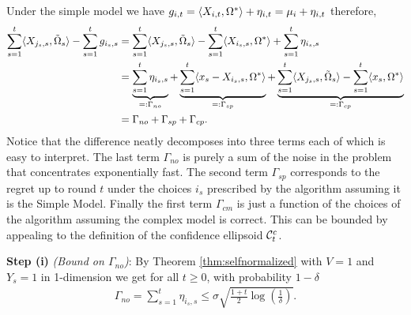 \begin{Proof} Under the simple model we have $g_{i,t} = \langle X_{i,t},\Omega^*\rangle + \eta_{i,t} = \mu_{i} + \eta_{i,t}$ therefore, 
\begin{align*}
    \sum_{s=1}^t \langle X_{j_s,s}, \tilde{\Omega}_s \rangle - \sum_{s=1}^t g_{i_s,s} & = \sum_{s=1}^t \langle X_{j_s,s}, \tilde{\Omega}_s \rangle - \sum_{s=1}^t \langle X_{i_s,s}, \Omega^* \rangle + \sum_{s=1}^t \eta_{i_s,s}\\
    & = \underbrace{ \sum_{s=1}^t \eta_{i_s,s}}_{=: \Gamma_{no}}+ \underbrace{\sum_{s=1}^t \langle x_s - X_{i_s,s} , \Omega^* \rangle}_{=:\Gamma_{sp}}+ \underbrace{\sum_{s=1}^t \langle X_{j_s,s}, \tilde{\Omega}_s \rangle - \sum_{s=1}^t \langle x_s, \Omega^* \rangle}_{=:\Gamma_{cp}} \\
    & = \Gamma_{no} + \Gamma_{sp} + \Gamma_{cp}.
\end{align*}
Notice that the difference neatly decomposes into three terms each of which is easy to interpret. The last term $\Gamma_{no}$ is purely a sum of the noise in the problem that concentrates exponentially fast. The second term $\Gamma_{sp}$ corresponds to the regret up to round $t$ under the choices $i_s$ prescribed by the algorithm assuming it is the Simple Model. Finally the first term $\Gamma_{cm}$ is just a function of the choices of the algorithm assuming the complex model is correct. This can be bounded by appealing to the definition of the confidence ellipsoid $\mathcal{C}_t^c$.

\textbf{Step (i)} \emph{(Bound on $\Gamma_{no}$)}:
By Theorem \ref{thm:selfnormalized} with $V=1$ and $Y_s = 1$ in 1-dimension we get for all $t\ge 0$, with probability $1-\delta$
\begin{align*}
    \Gamma_{no} = \sum_{s=1}^{t} \eta_{i_s,s} \le \sigma\sqrt{\frac{1+t}{2}\log\left(\frac{1}{\delta}\right)}.
\end{align*}
 


\end{Proof}
